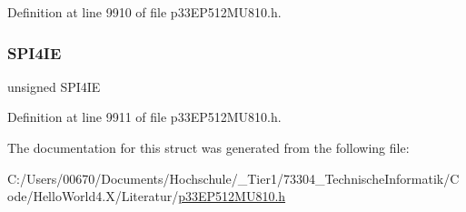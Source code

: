Definition at line 9910 of file p33\+E\+P512\+M\+U810.\+h.

\mbox{\label{structtag_i_e_c7_b_i_t_s_ab98b0e4c48d90109fe2f5ada0eb40b30}} 
\subsubsection{\texorpdfstring{S\+P\+I4\+IE}{SPI4IE}}
{\footnotesize\ttfamily unsigned S\+P\+I4\+IE}



Definition at line 9911 of file p33\+E\+P512\+M\+U810.\+h.



The documentation for this struct was generated from the following file\+:\begin{DoxyCompactItemize}
\item 
C\+:/\+Users/00670/\+Documents/\+Hochschule/\+\_\+\+Tier1/73304\+\_\+\+Technische\+Informatik/\+Code/\+Hello\+World4.\+X/\+Literatur/\hyperlink{p33_e_p512_m_u810_8h}{p33\+E\+P512\+M\+U810.\+h}\end{DoxyCompactItemize}
